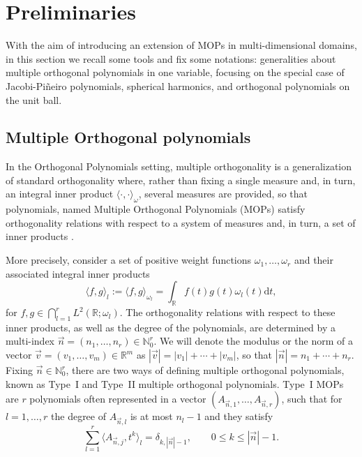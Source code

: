 \documentclass[a4paper]{article}
\theoremstyle{plain}
\theoremstyle{definition}
\newcommand{\NN}{\mathbb{N}}
\newcommand{\RR}{\mathbb{R}}
\newcommand{\dr}{\mathrm{d}}
\newcommand{\innerprod}[2]{\langle #1 , #2 \rangle}
\begin{document}
	
\section{Preliminaries}\label{sec:pre}

With the aim of introducing an extension of MOPs in multi-dimensional domains, in this section we recall some tools and fix some notations: generalities about multiple orthogonal polynomials in one variable, focusing on the special case of Jacobi-Pi\~neiro polynomials, spherical harmonics, and orthogonal polynomials on the unit ball. 

\subsection{Multiple Orthogonal polynomials}

In the Orthogonal Polynomials setting, multiple orthogonality is a generalization of standard orthogonality where, rather than fixing a single measure and, in turn, an integral inner product $\innerprod{\cdot}{\cdot}_\omega$, several measures are provided, so that polynomials, named Multiple Orthogonal Polynomials (MOPs) satisfy orthogonality relations with respect to a system of measures and, in turn, a set of inner products  \cite{VA20, Ism05, Apt98}.

More precisely, consider a set of positive weight functions $\omega_1,\dots,\omega_r$ and their associated integral inner products
\begin{equation*}
    \innerprod{f}{g}_l := \innerprod{f}{g}_{\omega_l}=\int_\RR f(t)g(t)\omega_l(t)\dr t,
\end{equation*}
for $f,g\in \bigcap_{l=1}^r L^2(\RR;\omega_l)$. The orthogonality relations with respect to these inner products, as well as the degree of the polynomials, are determined by a multi-index $\vec n =(n_1,\dots,n_r)\in\NN^r_0$. We will denote the modulus or the norm of a vector $\vec v =(v_1,\dots,v_m)\in\mathbb R^m$ as $|\vec v|=|v_1|+\cdots +|v_m|$, so that $|\vec n| =n_1+\cdots+n_r$.\\

Fixing $\vec n\in\NN^r_0$, there are two ways of defining multiple orthogonal polynomials, known as Type~I and Type~II multiple orthogonal polynomials. Type~I MOPs are $r$ polynomials often represented in a vector $(A_{\vec n,1},\dots,A_{\vec n,r})$, such that for $l=1,\dots, r$ the degree of  $A_{\vec n,l}$ is at most $n_l-1$ and they satisfy 
\begin{equation}
\label{eq:type-i-orthogonality-1-var}    
\sum_{l=1}^r \innerprod{A_{\vec n,j}}{t^k}_l=\delta_{k,|\vec n|-1}, \qquad 0\leq k \leq |\vec n|-1.
\end{equation}
\end{document}
